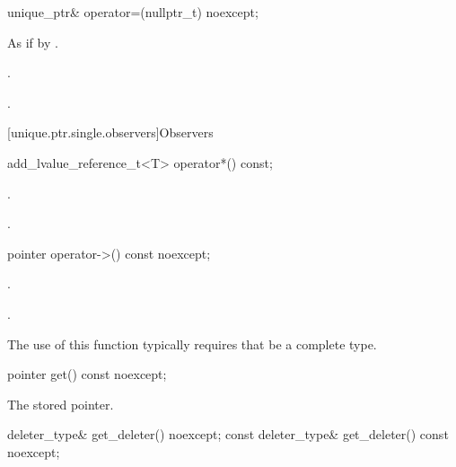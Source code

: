 %
\begin{itemdecl}
unique_ptr& operator=(nullptr_t) noexcept;
\end{itemdecl}

\begin{itemdescr}
\pnum
\effects As if by .

\pnum
\ensures {}.

\pnum
\returns {}.
\end{itemdescr}

[unique.ptr.single.observers]{Observers}

%
\begin{itemdecl}
add_lvalue_reference_t<T> operator*() const;
\end{itemdecl}

\begin{itemdescr}
\pnum
\requires {}.

\pnum
\returns {}.

\end{itemdescr}

%
\begin{itemdecl}
pointer operator->() const noexcept;
\end{itemdecl}

\begin{itemdescr}
\pnum
\requires {}.

\pnum
\returns {}.

\pnum
\begin{note}
The use of this function typically requires that  be a complete type.
\end{note}
\end{itemdescr}

%
\begin{itemdecl}
pointer get() const noexcept;
\end{itemdecl}

\begin{itemdescr}
\pnum
\returns The stored pointer.
\end{itemdescr}

%
\begin{itemdecl}
deleter_type& get_deleter() noexcept;
const deleter_type& get_deleter() const noexcept;
\end{itemdecl}

